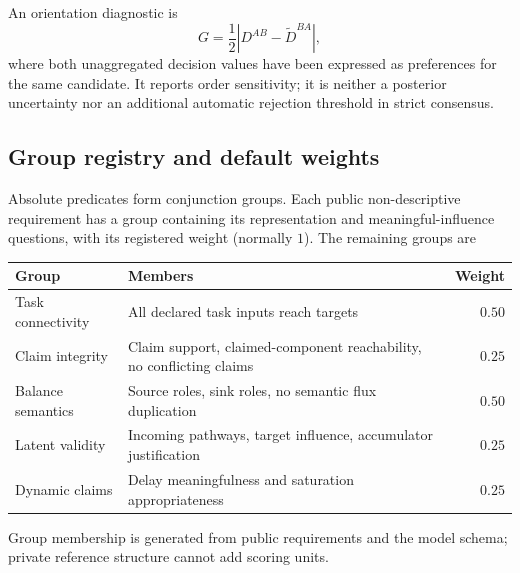 \documentclass[11pt]{article}
\begin{document}
An orientation diagnostic is
\begin{equation}
 G=\frac12\left|D^{AB}-\widetilde D^{BA}\right|,
\end{equation}
where both unaggregated decision values have been expressed as preferences for
the same candidate. It reports order sensitivity; it is neither a posterior
uncertainty nor an additional automatic rejection threshold in strict consensus.

\subsection{Group registry and default weights}
Absolute predicates form conjunction groups. Each public non-descriptive
requirement has a group containing its representation and meaningful-influence
questions, with its registered weight (normally $1$). The remaining groups are
\begin{center}
\begin{tabularx}{\textwidth}{lXr}
\toprule
Group & Members & Weight\\
\midrule
Task connectivity & All declared task inputs reach targets & $0.50$\\
Claim integrity & Claim support, claimed-component reachability, no conflicting claims & $0.25$\\
Balance semantics & Source roles, sink roles, no semantic flux duplication & $0.50$\\
Latent validity & Incoming pathways, target influence, accumulator justification & $0.25$\\
Dynamic claims & Delay meaningfulness and saturation appropriateness & $0.25$\\
\bottomrule
\end{tabularx}
\end{center}
Group membership is generated from public requirements and the model schema;
private reference structure cannot add scoring units.
\end{document}
